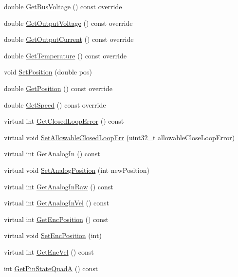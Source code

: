 \begin{DoxyCompactItemize}
\item 
double \hyperlink{class_c_a_n_talon_a54bf29776c50598a1a9686651f6fadd0}{Get\+Bus\+Voltage} () const override
\item 
double \hyperlink{class_c_a_n_talon_a47899fde5026631d18cdfa6fdce29b1d}{Get\+Output\+Voltage} () const override
\item 
double \hyperlink{class_c_a_n_talon_af24e57fe1d6a7ec64ab1a836d4d9c5ce}{Get\+Output\+Current} () const override
\item 
double \hyperlink{class_c_a_n_talon_aab26bf049aa996de5fab27455ed956da}{Get\+Temperature} () const override
\item 
void \hyperlink{class_c_a_n_talon_a9e30edc8e7240e17abce7125a2a6c72c}{Set\+Position} (double pos)
\item 
double \hyperlink{class_c_a_n_talon_aedc47efb529bd41b55849e628363e661}{Get\+Position} () const override
\item 
double \hyperlink{class_c_a_n_talon_a36e486b58bc5ce1b218d36468900bb1b}{Get\+Speed} () const override
\item 
virtual int \hyperlink{class_c_a_n_talon_ae96f0f4eda41e611866453636382780b}{Get\+Closed\+Loop\+Error} () const
\item 
virtual void \hyperlink{class_c_a_n_talon_ab497835f7003788c3a25b2f8b9e4db55}{Set\+Allowable\+Closed\+Loop\+Err} (uint32\+\_\+t allowable\+Close\+Loop\+Error)
\item 
virtual int \hyperlink{class_c_a_n_talon_a8dbf7974dc2877b4b32c1462e16fb9f1}{Get\+Analog\+In} () const
\item 
virtual void \hyperlink{class_c_a_n_talon_a2893e5777fc2904d9aeab91c283d19df}{Set\+Analog\+Position} (int new\+Position)
\item 
virtual int \hyperlink{class_c_a_n_talon_aaf2d5a3f142d57b8a5f17be332d57b58}{Get\+Analog\+In\+Raw} () const
\item 
virtual int \hyperlink{class_c_a_n_talon_a2191c4ae935c1bdb33fb622402d0676f}{Get\+Analog\+In\+Vel} () const
\item 
virtual int \hyperlink{class_c_a_n_talon_a9ccad36fcf60791617bae9bb0f1443b4}{Get\+Enc\+Position} () const
\item 
virtual void \hyperlink{class_c_a_n_talon_a00b16233647cf4ae540d14236d8ee01d}{Set\+Enc\+Position} (int)
\item 
virtual int \hyperlink{class_c_a_n_talon_a1ecf556f18bc6a61278e2d27408f25af}{Get\+Enc\+Vel} () const
\item 
int \hyperlink{class_c_a_n_talon_ac591175f87e34f153118cb507c132c8f}{Get\+Pin\+State\+QuadA} () const

\end{DoxyCompactItemize}
